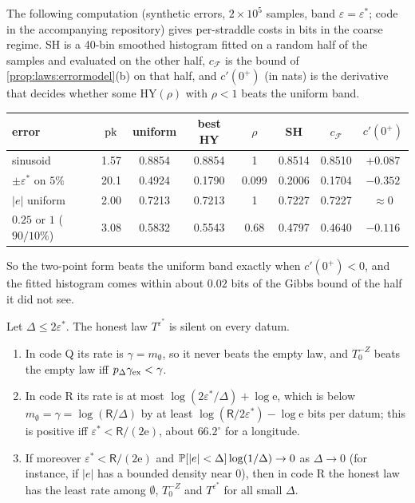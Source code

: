 The following computation (synthetic errors, $2\times10^5$ samples, band $\varepsilon=\varepsilon^*$; code in the accompanying repository) gives per-straddle costs in bits in the coarse regime. SH is a 40-bin smoothed histogram fitted on a random half of the samples and evaluated on the other half, $c_{\mathcal F}$ is the bound of \cref{prop:laws:errormodel}(b) on that half, and $c'(0^+)$ (in nats) is the derivative that decides whether some $\mathrm{HY}(\rho)$ with $\rho<1$ beats the uniform band.
\begin{center}\small
\begin{tabular}{lccccccc}
\toprule
error & $\mathrm{pk}$ & uniform & best HY & $\rho$ & SH & $c_{\mathcal F}$ & $c'(0^+)$\\
\midrule
sinusoid & 1.57 & 0.8854 & 0.8854 & 1 & 0.8514 & 0.8510 & $+0.087$\\
$\pm\varepsilon^*$ on $5\%$ & 20.1 & 0.4924 & 0.1790 & 0.099 & 0.2006 & 0.1704 & $-0.352$\\
$\lvert e\rvert$ uniform & 2.00 & 0.7213 & 0.7213 & 1 & 0.7227 & 0.7227 & $\approx0$\\
$0.25$ or $1$ ($90/10\%$) & 3.08 & 0.5832 & 0.5543 & 0.68 & 0.4797 & 0.4640 & $-0.116$\\
\bottomrule
\end{tabular}
\end{center}

So the two-point form beats the uniform band exactly when $c'(0^+)<0$, and the fitted histogram comes within about $0.02$ bits of the Gibbs bound of the half it did not see.

\begin{proposition}\label{prop:laws:fine}
Let $\Delta\le2\varepsilon^*$. The honest law $T^{\varepsilon^*}$ is silent on every datum.
\begin{enumerate}[label=(\alph*),itemsep=1pt,topsep=2pt]
\item In code Q its rate is $\gamma=m_\emptyset$, so it never beats the empty law, and $T_0^{-Z}$ beats the empty law iff $p_\Delta\gamma_{\rm ex}<\gamma$.
\item In code R its rate is at most $\log(2\varepsilon^*/\Delta)+\log\mathrm e$, which is below $m_\emptyset=\gamma=\log(\mathsf R/\Delta)$ by at least $\log(\mathsf R/2\varepsilon^*)-\log\mathrm e$ bits per datum; this is positive iff $\varepsilon^*<\mathsf R/(2\mathrm e)$, about $66.2^\circ$ for a longitude.
\item If moreover $\varepsilon^*<\mathsf R/(2\mathrm e)$ and $\mathbb{P}[\lvert e\rvert<\Delta]\log(1/\Delta)\to0$ as $\Delta\to0$ (for instance, if $\lvert e\rvert$ has a bounded density near $0$), then in code R the honest law has the least rate among $\emptyset$, $T_0^{-Z}$ and $T^{\varepsilon^*}$ for all small $\Delta$.
\end{enumerate}
\end{proposition}


